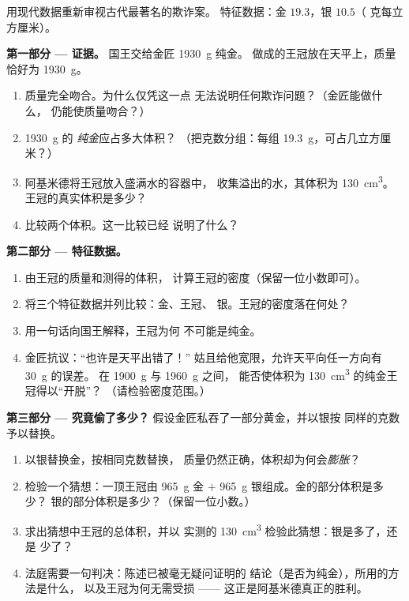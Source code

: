 \begin{problem}\label{pb:g6:density-floating:1}
用现代数据重新审视古代最著名的欺诈案。
特征数据：金 $19.3$，银 $10.5$（
克每立方厘米）。

\medskip\noindent\textbf{第一部分 --- 证据。}
国王交给金匠 \qty{1930}{g} 纯金。
做成的王冠放在天平上，质量恰好为 \qty{1930}{g}。
\begin{enumerate}
  \item 质量完全吻合。为什么仅凭这一点
        无法说明任何欺诈问题？（金匠能做什么，
        仍能使质量吻合？）
  \item \qty{1930}{g} 的 \emph{纯金}应占多大体积？
        （把克数分组：每组
        \qty{19.3}{g}，可占几立方厘米？）
  \item 阿基米德将王冠放入盛满水的容器中，
        收集溢出的水，其体积为 \qty{130}{cm^3}。
        王冠的真实体积是多少？
  \item 比较两个体积。这一比较已经
        说明了什么？
\end{enumerate}

\medskip\noindent\textbf{第二部分 --- 特征数据。}
\begin{enumerate}[resume]
  \item 由王冠的质量和测得的体积，
        计算王冠的密度（保留一位小数即可）。
  \item 将三个特征数据并列比较：金、王冠、
        银。王冠的密度落在何处？
  \item 用一句话向国王解释，王冠为何
        不可能是纯金。
  \item 金匠抗议：“也许是天平出错了！”
        姑且给他宽限，允许天平向任一方向有 \qty{30}{g} 的误差。
        在 \qty{1900}{g} 与 \qty{1960}{g} 之间，
        能否使体积为 \qty{130}{cm^3} 的纯金王冠得以“开脱”？
        （请检验密度范围。）
\end{enumerate}

\medskip\noindent\textbf{第三部分 --- 究竟偷了多少？}
假设金匠私吞了一部分黄金，并以银按
同样的克数予以替换。
\begin{enumerate}[resume]
  \item 以银替换金，按相同克数替换，
        质量仍然正确，体积却为何会\emph{膨胀}？
  \item 检验一个猜想：一顶王冠由 \qty{965}{g} 金 $+$
        \qty{965}{g} 银组成。金的部分体积是多少？
        银的部分体积是多少？（保留一位小数。）
  \item 求出猜想中王冠的总体积，并以
        实测的 \qty{130}{cm^3} 检验此猜想：银是多了，还是
        少了？
  \item 法庭需要一句判决：陈述已被毫无疑问证明的
        结论（是否为纯金），所用的方法是什么，
        以及王冠为何无需受损 ——
        这正是阿基米德真正的胜利。
\end{enumerate}
\end{problem}
